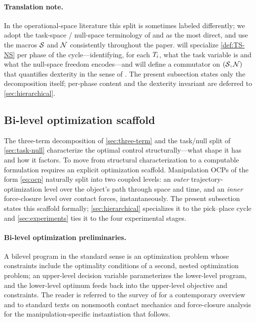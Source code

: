 \paragraph{Translation note.}
In the operational-space literature this split is sometimes labeled
differently; we adopt the task-space / null-space terminology of
\citet{Khatib1987} and \citet{Nakamura1991} as the most direct, and
use the macros $\mathcal{S}$ and $\mathcal{N}$ consistently throughout the
paper.  will specialize
\cref{def:TS-NS} per phase of the cycle---identifying, for each
$T_{i}$, what the task variable is and what the null-space
freedom encodes---and will define a commutator on $(\mathcal{S}, \mathcal{N})$
that quantifies dexterity in the sense of \citet{Yoshikawa1985}.
The present subsection states only the decomposition itself;
per-phase content and the dexterity invariant are deferred to
\cref{sec:hierarchical}.

\subsection{Bi-level optimization scaffold}
\label{sec:bilevel}

The three-term decomposition of \cref{sec:three-term} and the
task/null split of \cref{sec:task-null} characterize the optimal
control structurally---what shape it has and how it factors. To
move from structural characterization to a computable formulation
requires an explicit optimization scaffold. Manipulation OCPs of
the form \eqref{eq:ocp} naturally split into two coupled levels:
an \emph{outer} trajectory-optimization level over the object's
path through space and time, and an \emph{inner} force-closure
level over contact forces, instantaneously. The present subsection
states this scaffold formally; \cref{sec:hierarchical} specializes
it to the pick--place cycle and \cref{sec:experiments} ties it to
the four experimental stages.

\paragraph{Bi-level optimization preliminaries.}
A bilevel program in the standard sense is an optimization problem
whose constraints include the optimality conditions of a second,
nested optimization problem; an upper-level decision variable
parameterizes the lower-level program, and the lower-level
optimum feeds back into the upper-level objective and constraints.
The reader is referred to the survey of \citet{Colson2007} for a
contemporary overview and to standard texts on nonsmooth contact
mechanics \citep{Brogliato2016} and force-closure analysis
\citep{MurrayLiSastry1994} for the manipulation-specific
instantiation that follows.

